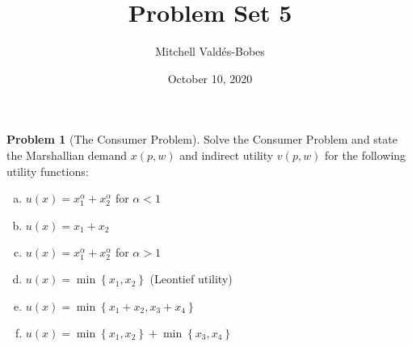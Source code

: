 \documentclass{article}
\title{Problem Set 5}
\author{Mitchell Valdés-Bobes}
\date{October 10, 2020}
\theoremstyle{definition}
\newtheorem{problem}{Problem}
\begin{document}
\maketitle
\begin{problem}[The Consumer Problem]
Solve the Consumer Problem and state the Marshallian demand $x(p, w)$ and indirect utility $v(p, w)$
for the following utility functions:
\begin{enumerate}[(a)]
    \item $u(x)=x_{1}^{\alpha}+x_{2}^{\alpha}$ for $\alpha<1$
    \item $u(x)=x_{1}+x_{2}$
    \item $u(x)=x_{1}^{\alpha}+x_{2}^{\alpha}$ for $\alpha>1$
    \item $u(x)=\min \left\{x_{1}, x_{2}\right\}$ (Leontief utility)
    \item $u(x)=\min \left\{x_{1}+x_{2}, x_{3}+x_{4}\right\}$
    \item $u(x)=\min \left\{x_{1}, x_{2}\right\}+\min \left\{x_{3}, x_{4}\right\}$
\end{enumerate}
\end{problem}
\end{document}
